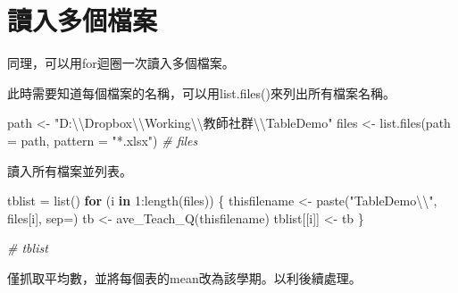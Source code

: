 \documentclass[
]{book}
\newenvironment{Shaded}{\begin{snugshade}}{\end{snugshade}}
\newcommand{\AttributeTok}[1]{\textcolor[rgb]{0.77,0.63,0.00}{#1}}
\newcommand{\CommentTok}[1]{\textcolor[rgb]{0.56,0.35,0.01}{\textit{#1}}}
\newcommand{\ControlFlowTok}[1]{\textcolor[rgb]{0.13,0.29,0.53}{\textbf{#1}}}
\newcommand{\DecValTok}[1]{\textcolor[rgb]{0.00,0.00,0.81}{#1}}
\newcommand{\FunctionTok}[1]{\textcolor[rgb]{0.00,0.00,0.00}{#1}}
\newcommand{\NormalTok}[1]{#1}
\newcommand{\OtherTok}[1]{\textcolor[rgb]{0.56,0.35,0.01}{#1}}
\newcommand{\SpecialCharTok}[1]{\textcolor[rgb]{0.00,0.00,0.00}{#1}}
\newcommand{\StringTok}[1]{\textcolor[rgb]{0.31,0.60,0.02}{#1}}
\begin{document}
\hypertarget{ux8b80ux5165ux591aux500bux6a94ux6848}{%
\section{讀入多個檔案}\label{ux8b80ux5165ux591aux500bux6a94ux6848}}

同理，可以用for迴圈一次讀入多個檔案。

此時需要知道每個檔案的名稱，可以用list.files()來列出所有檔案名稱。

\begin{Shaded}
\begin{Highlighting}[]
\NormalTok{path }\OtherTok{\textless{}{-}} \StringTok{"D:}\SpecialCharTok{\textbackslash{}\textbackslash{}}\StringTok{Dropbox}\SpecialCharTok{\textbackslash{}\textbackslash{}}\StringTok{Working}\SpecialCharTok{\textbackslash{}\textbackslash{}}\StringTok{教師社群}\SpecialCharTok{\textbackslash{}\textbackslash{}}\StringTok{TableDemo"}
\NormalTok{files }\OtherTok{\textless{}{-}} \FunctionTok{list.files}\NormalTok{(}\AttributeTok{path =}\NormalTok{ path, }\AttributeTok{pattern =} \StringTok{"*.xlsx"}\NormalTok{)}
\CommentTok{\# files}
\end{Highlighting}
\end{Shaded}

讀入所有檔案並列表。

\begin{Shaded}
\begin{Highlighting}[]
\NormalTok{tblist }\OtherTok{=} \FunctionTok{list}\NormalTok{()}
\ControlFlowTok{for}\NormalTok{ (i }\ControlFlowTok{in} \DecValTok{1}\SpecialCharTok{:}\FunctionTok{length}\NormalTok{(files)) \{}
\NormalTok{  thisfilename }\OtherTok{\textless{}{-}} \FunctionTok{paste}\NormalTok{(}\StringTok{"TableDemo}\SpecialCharTok{\textbackslash{}\textbackslash{}}\StringTok{"}\NormalTok{, files[i], }\AttributeTok{sep=}\StringTok{\textquotesingle{}\textquotesingle{}}\NormalTok{)}
\NormalTok{  tb }\OtherTok{\textless{}{-}} \FunctionTok{ave\_Teach\_Q}\NormalTok{(thisfilename)}
\NormalTok{  tblist[[i]] }\OtherTok{\textless{}{-}}\NormalTok{ tb}
\NormalTok{\}}

\CommentTok{\# tblist}
\end{Highlighting}
\end{Shaded}

僅抓取平均數，並將每個表的mean改為該學期。以利後續處理。
\end{document}
